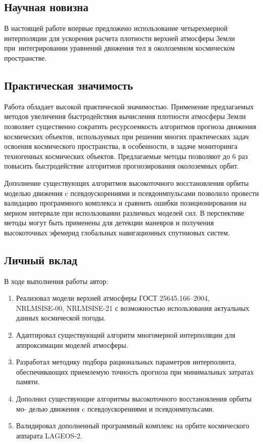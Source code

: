 \subsection*{Научная новизна}

В настоящей работе впервые предложено использование четырехмерной интерполяции для
ускорения расчета плотности верхней атмосферы Земли 
при интегрировании уравнений движения тел в околоземном космическом пространстве.

\subsection*{Практическая значимость}

Работа обладает высокой практической значимостью. 
Применение предлагаемых методов увеличения быстродействия вычисления плотности атмосферы 
Земли позволяет существенно сократить ресурсоемкость алгоритмов 
прогноза движения космических объектов, используемых при решении 
многих практических задач освоения космического пространства, в особенности, в задаче 
мониторинга техногенных космических объектов. Предлагаемые методы позволяют до 6 раз 
повысить быстродействие алгоритмов прогнозирования околоземных орбит.

Дополнение существующих алгоритмов высокоточного восстановления орбиты моделью 
движения c псевдоускорениями и псевдоимпульсами позволило провести валидацию
программного комплекса и сравнить ошибки позиционирования на мерном интервале при
использовании различных моделей сил. В перспективе методы могут быть применены для детекции маневров и
получения высокоточных эфемерид глобальных навигационных спутниовых систем.

\subsection*{Личный вклад}

В ходе выполнения работы автор:
\begin{enumerate}
    \item Реализовал модели верхней атмосферы ГОСТ 25645.166–2004, \\
    NRLMSISE-00, NRLMSISE-21
    с возможностью использования актуальных данных космической погоды.
    \item Адаптировал существующий алгоритм многомерной интерполяции для
    аппроксимации моделей атмосферы.
    \item Разработал методику подбора рациональных параметров интерполянта,
    обеспечивающих приемлемую точность прогноза при минимальных затратах памяти.
    \item Дополнил существующие алгоритмы высокоточного восстановления орбиты мо-
    делью движения c псевдоускорениями и псевдоимпульсами.
    \item Валидировал дополненный программный комплекс на орбите космического аппарата LAGEOS-2.
\end{enumerate}


\newpage
